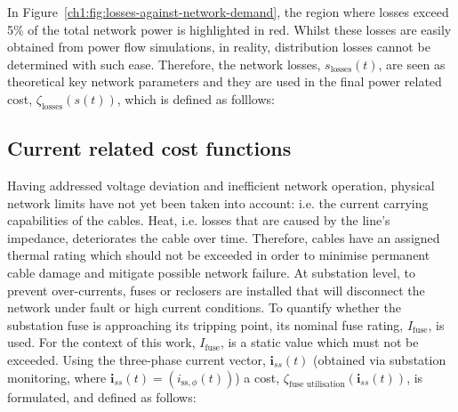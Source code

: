 


In Figure~\ref{ch1:fig:losses-against-network-demand}, the region where losses exceed 5\% of the total network power is highlighted in red.
Whilst these losses are easily obtained from power flow simulations, in reality, distribution losses cannot be determined with such ease.
Therefore, the network losses, $s_\text{losses}(t)$, are seen as theoretical key network parameters and they are used in the final power related cost, $\zeta_\text{losses}(s(t))$, which is defined as folllows:



\subsection{Current related cost functions}
\label{ch1:subsec:currents-related-cost-functions}


Having addressed voltage deviation and inefficient network operation, physical network limits have not yet been taken into account: i.e. the current carrying capabilities of the cables.
Heat, i.e. losses that are caused by the line's impedance, deteriorates the cable over time.
Therefore, cables have an assigned thermal rating which should not be exceeded in order to minimise permanent cable damage and mitigate possible network failure.
At substation level, to prevent over-currents, fuses or reclosers are installed that will disconnect the network under fault or high current conditions.
To quantify whether the substation fuse is approaching its tripping point, its nominal fuse rating, $I_\text{fuse}$, is used.
For the context of this work, $I_\text{fuse}$, is a static value which must not be exceeded.
Using the three-phase current vector, $\textbf{i}_{ss}(t)$ (obtained via substation monitoring, where $\textbf{i}_{ss}(t) = (i_{\text{ss},\phi}(t))$) a cost, $\zeta_\text{fuse utilisation}(\textbf{i}_{ss}(t))$, is formulated, and defined as follows:

